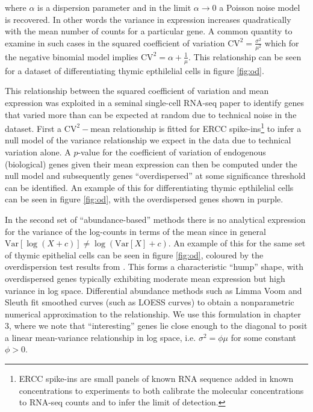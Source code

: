 where $\alpha$ is a dispersion parameter and in the limit $\alpha \rightarrow 0$ a Poisson noise model is recovered. In other words the variance in expression increases quadratically with the mean number of counts for a particular gene. A common quantity to examine in such cases in the squared coefficient of variation $\text{CV}^2 = \frac{\sigma^2}{\mu^2}$ which for the negative binomial model implies $\text{CV}^2 = \alpha + \frac{1}{\mu}$. This relationship can be seen for a dataset of differentiating thymic epthilelial cells in figure \ref{fig:od}.

This relationship between the squared coefficient of variation and mean expression was exploited in a seminal single-cell RNA-seq paper \cite{Brennecke2013-xy} to identify genes that varied more than can be expected at random due to technical noise in the dataset. First a $\text{CV}^2-\text{mean}$ relationship is fitted for ERCC spike-ins\footnote{
ERCC spike-ins are small panels of known RNA sequence added in known concentrations to experiments to both calibrate the molecular concentrations to RNA-seq counts and to infer the limit of detection.
} to infer a null model of the variance relationship we expect in the data due to technical variation alone. A $p$-value for the coefficient of variation of endogenous (biological) genes given their mean expression can then be computed under the null model and subsequently genes ``overdispersed'' at some significance threshold can be identified. An example of this for differentiating thymic epthilelial cells can be seen in figure \ref{fig:od}, with the overdispersed genes shown in purple.

In the second set of ``abundance-based'' methods there is no analytical expression for the variance of the log-counts in terms of the mean since in general $\text{Var}[\log(X + c)] \neq \log(\text{Var}[X] + c)$. An example of this for the same set of thymic epithelial cells can be seen in figure \ref{fig:od}, coloured by the overdispersion test results from \cite{Brennecke2013-xy}. This forms a characteristic ``hump'' shape, with overdispersed genes typically exhibiting moderate mean expression but high variance in log space. Differential abundance methods such as Limma Voom \cite{Law2014-tu} and Sleuth \cite{Pimentel2016-xz} fit smoothed curves (such as LOESS curves) to obtain a nonparametric numerical approximation to the relationship. We use this formulation in chapter 3, where we note that ``interesting'' genes lie close enough to the diagonal to posit a linear mean-variance relationship in log space, i.e. $\sigma^2 = \phi \mu$ for some constant $\phi > 0$.

